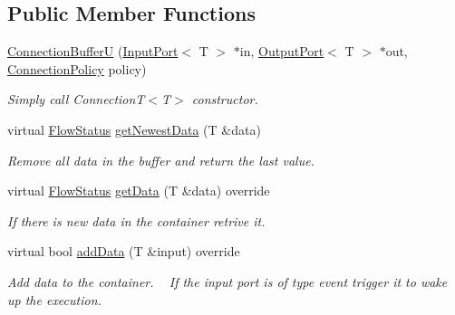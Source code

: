 \subsection*{Public Member Functions}
\begin{DoxyCompactItemize}
\item 
\hypertarget{classcoco_1_1_connection_buffer_u_aebbc3c18dd8b27f11dcdc83b15f24770}{}\hyperlink{classcoco_1_1_connection_buffer_u_aebbc3c18dd8b27f11dcdc83b15f24770}{Connection\+Buffer\+U} (\hyperlink{classcoco_1_1_input_port}{Input\+Port}$<$ T $>$ $\ast$in, \hyperlink{classcoco_1_1_output_port}{Output\+Port}$<$ T $>$ $\ast$out, \hyperlink{structcoco_1_1_connection_policy}{Connection\+Policy} policy)\label{classcoco_1_1_connection_buffer_u_aebbc3c18dd8b27f11dcdc83b15f24770}

\begin{DoxyCompactList}\small\item\em Simply call Connection\+T$<$\+T$>$ constructor. \end{DoxyCompactList}\item 
\hypertarget{classcoco_1_1_connection_buffer_u_a853c1a94c0d2e3c937298860a5c8cbe3}{}virtual \hyperlink{namespacecoco_a057be58377e415c9be98c1dc5c8426ad}{Flow\+Status} \hyperlink{classcoco_1_1_connection_buffer_u_a853c1a94c0d2e3c937298860a5c8cbe3}{get\+Newest\+Data} (T \&data)\label{classcoco_1_1_connection_buffer_u_a853c1a94c0d2e3c937298860a5c8cbe3}

\begin{DoxyCompactList}\small\item\em Remove all data in the buffer and return the last value. \end{DoxyCompactList}\item 
\hypertarget{classcoco_1_1_connection_buffer_u_ab66b2f4a90e2757c796497f38c8e1695}{}virtual \hyperlink{namespacecoco_a057be58377e415c9be98c1dc5c8426ad}{Flow\+Status} \hyperlink{classcoco_1_1_connection_buffer_u_ab66b2f4a90e2757c796497f38c8e1695}{get\+Data} (T \&data) override\label{classcoco_1_1_connection_buffer_u_ab66b2f4a90e2757c796497f38c8e1695}

\begin{DoxyCompactList}\small\item\em If there is new data in the container retrive it. \end{DoxyCompactList}\item 
\hypertarget{classcoco_1_1_connection_buffer_u_a9cedcd1db28cb0bc70adda82e25538e1}{}virtual bool \hyperlink{classcoco_1_1_connection_buffer_u_a9cedcd1db28cb0bc70adda82e25538e1}{add\+Data} (T \&input) override\label{classcoco_1_1_connection_buffer_u_a9cedcd1db28cb0bc70adda82e25538e1}

\begin{DoxyCompactList}\small\item\em Add data to the container. ~\newline
 If the input port is of type event trigger it to wake up the execution. \end{DoxyCompactList}\end{DoxyCompactItemize}
